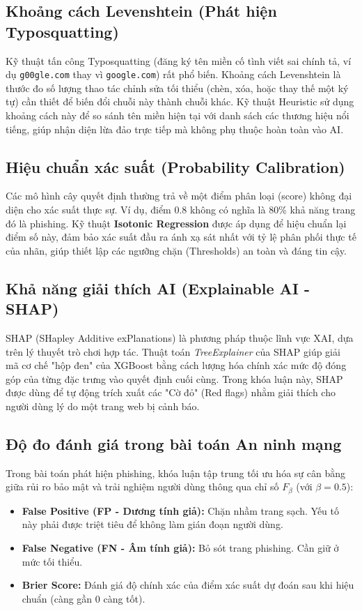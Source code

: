 \subsection{Khoảng cách Levenshtein (Phát hiện Typosquatting)}
Kỹ thuật tấn công Typosquatting (đăng ký tên miền cố tình viết sai chính tả, ví dụ \texttt{g00gle.com} thay vì \texttt{google.com}) rất phổ biến. Khoảng cách Levenshtein là thước đo số lượng thao tác chỉnh sửa tối thiểu (chèn, xóa, hoặc thay thế một ký tự) cần thiết để biến đổi chuỗi này thành chuỗi khác. Kỹ thuật Heuristic sử dụng khoảng cách này để so sánh tên miền hiện tại với danh sách các thương hiệu nổi tiếng, giúp nhận diện lừa đảo trực tiếp mà không phụ thuộc hoàn toàn vào AI.

\subsection{Hiệu chuẩn xác suất (Probability Calibration)}
Các mô hình cây quyết định thường trả về một điểm phân loại (score) không đại diện cho xác suất thực sự. Ví dụ, điểm 0.8 không có nghĩa là 80\% khả năng trang đó là phishing. Kỹ thuật \textbf{Isotonic Regression} được áp dụng để hiệu chuẩn lại điểm số này, đảm bảo xác suất đầu ra ánh xạ sát nhất với tỷ lệ phân phối thực tế của nhãn, giúp thiết lập các ngưỡng chặn (Thresholds) an toàn và đáng tin cậy.

\subsection{Khả năng giải thích AI (Explainable AI - SHAP)}
SHAP (SHapley Additive exPlanations) là phương pháp thuộc lĩnh vực XAI, dựa trên lý thuyết trò chơi hợp tác. Thuật toán \textit{TreeExplainer} của SHAP giúp giải mã cơ chế "hộp đen" của XGBoost bằng cách lượng hóa chính xác mức độ đóng góp của từng đặc trưng vào quyết định cuối cùng. Trong khóa luận này, SHAP được dùng để tự động trích xuất các "Cờ đỏ" (Red flags) nhằm giải thích cho người dùng lý do một trang web bị cảnh báo.

\subsection{Độ đo đánh giá trong bài toán An ninh mạng}
Trong bài toán phát hiện phishing, khóa luận tập trung tối ưu hóa sự cân bằng giữa rủi ro bảo mật và trải nghiệm người dùng thông qua chỉ số $F_{\beta}$ (với $\beta = 0.5$):
\begin{itemize}
    \item \textbf{False Positive (FP - Dương tính giả):} Chặn nhầm trang sạch. Yếu tố này phải được triệt tiêu để không làm gián đoạn người dùng.
    \item \textbf{False Negative (FN - Âm tính giả):} Bỏ sót trang phishing. Cần giữ ở mức tối thiểu.
    \item \textbf{Brier Score:} Đánh giá độ chính xác của điểm xác suất dự đoán sau khi hiệu chuẩn (càng gần 0 càng tốt).
\end{itemize}